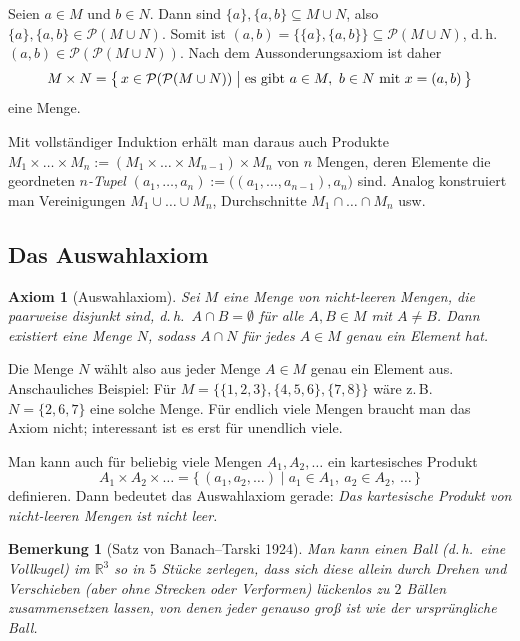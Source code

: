 \documentclass[a4paper]{article}
\makeatletter
\theoremstyle{kurzskript}
\newtheorem{bemerkung}[satz]{Bemerkung}
\newtheorem{axiom}{Axiom}                    %
\renewenvironment{proof}[1][\proofname]{\par\pushQED{\qed}%
  \normalfont\topsep\medskipamount\relax
  \trivlist\item[\hskip\labelsep\bfseries #1\@addpunct{.}]\ignorespaces}%
  {\popQED\endtrivlist\@endpefalse}
\renewcommand{\proofname}{Beweis}
\newcommand{\R}{\mathbb{R}}
\newcommand{\Pot}{\mathcal{P}}
\makeatother
\begin{document}
\begin{proof}
Seien $a \in M$ und $b \in N$. Dann sind $\{a\}, \{a, b\} \subseteq M \cup N$, also $\{a\}, \{a, b\} \in \Pot(M \cup N)$. Somit ist $(a, b) = \bigl\{\{a\}, \{a, b\}\bigr\} \subseteq \Pot(M \cup N)$, d.\,h.\ $(a, b) \in \Pot(\Pot(M \cup N))$. Nach dem Aussonderungsaxiom ist daher
\[
  M \times N = \bigl\{\, x \in \Pot(\Pot(M \cup N)) \bigm| \text{es gibt } a \in M,\ b \in N \text{ mit } x = (a, b) \,\bigr\}
\]
eine Menge.
\end{proof}

Mit vollständiger Induktion erhält man daraus auch Produkte $M_1 \times \dots \times M_n := (M_1 \times \dots \times M_{n-1}) \times M_n$ von $n$ Mengen, deren Elemente die geordneten \emph{$n$-Tupel} $(a_1, \dots, a_n) := \bigl((a_1, \dots, a_{n-1}), a_n\bigr)$ sind. Analog konstruiert man Vereinigungen $M_1 \cup \dots \cup M_n$, Durchschnitte $M_1 \cap \dots \cap M_n$ usw.

\subsection{Das Auswahlaxiom}

\begin{axiom}[Auswahlaxiom]
Sei $M$ eine Menge von nicht-leeren Mengen, die paarweise disjunkt sind, d.\,h.\ $A \cap B = \emptyset$ für alle $A, B \in M$ mit $A \neq B$. Dann existiert eine Menge $N$, sodass $A \cap N$ für jedes $A \in M$ genau ein Element hat.
\end{axiom}

Die Menge $N$ \glqq wählt\grqq{} also aus jeder Menge $A \in M$ genau ein Element aus. Anschauliches Beispiel: Für $M = \bigl\{\{1, 2, 3\}, \{4, 5, 6\}, \{7, 8\}\bigr\}$ wäre z.\,B.\ $N = \{2, 6, 7\}$ eine solche Menge. Für endlich viele Mengen braucht man das Axiom nicht; interessant ist es erst für unendlich viele.

Man kann auch für beliebig viele Mengen $A_1, A_2, \dots$ ein kartesisches Produkt
\[
  A_1 \times A_2 \times \dots = \{\, (a_1, a_2, \dots) \mid a_1 \in A_1,\ a_2 \in A_2,\ \dots \,\}
\]
definieren. Dann bedeutet das Auswahlaxiom gerade: \emph{Das kartesische Produkt von nicht-leeren Mengen ist nicht leer.}

\begin{bemerkung}[Satz von Banach--Tarski 1924]
Man kann einen Ball (d.\,h.\ eine Vollkugel) im $\R^3$ so in $5$ Stücke zerlegen, dass sich diese allein durch Drehen und Verschieben (aber ohne Strecken oder Verformen) lückenlos zu $2$ Bällen zusammensetzen lassen, von denen jeder genauso groß ist wie der ursprüngliche Ball.
\end{bemerkung}
\end{document}
